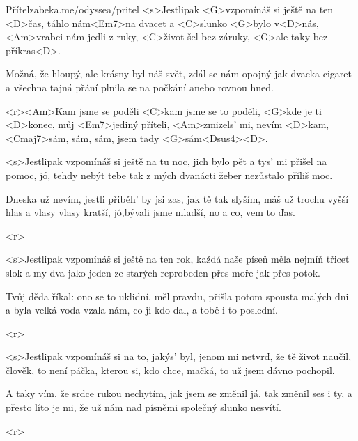 \begin{song}{51}{Přítel}{zabeka.me/odyssea/pritel}
	<s>Jestlipak <G>vzpomínáš si ještě na ten <D>čas,
	táhlo nám<Em7>na dvacet a <C>slunko <G>bylo v<D>nás,
	<Am>vrabci nám jedli z ruky,
	<C>život šel bez záruky,
	<G>ale taky bez příkras<D>.

	Možná, že hloupý, ale krásny byl náš svět,
	zdál se nám opojný jak dvacka cigaret
	a všechna tajná přání
	plnila se na počkání anebo rovnou hned.

	<r><Am>Kam jsme se poděli
	<C>kam jsme se to poděli,
	<G>kde je ti <D>konec, můj <Em7>jediný příteli,
	<Am>zmizels' mi, nevím <D>kam,
	<Cmaj7>sám, sám, sám, jsem tady <G>sám<Dsus4><D>.

	<s>Jestlipak vzpomínáš si ještě na tu noc,
	jich bylo pět a tys' mi přišel na pomoc,
	jó, tehdy nebýt tebe tak z mých
	dvanácti žeber nezůstalo příliš moc.

	Dneska už nevím, jestli přiběh' by jsi zas,
	jak tě tak slyším, máš už trochu vyšší hlas
	a vlasy vlasy kratší, jó,bývali jsme mladší,
	no a co, vem to ďas.

	<r>

	<s>Jestlipak vzpomínáš si ještě na ten rok,
	každá naše píseň měla nejmíň třicet slok
	a my dva jako jeden ze starých reprobeden
	přes moře jak přes potok.

	Tvůj děda říkal: ono se to uklidní,
	měl pravdu, přišla potom spousta malých dni
	a byla velká voda vzala nám, co ji kdo dal,
	a tobě i to poslední.

	<r>

	<s>Jestlipak vzpomínáš si na to, jakýs' byl,
	jenom mi netvrď, že tě život naučil,
	člověk, to není páčka,
	kterou si, kdo chce, mačká,
	to už jsem dávno pochopil.

	A taky vím, že srdce rukou nechytím,
	jak jsem se změnil já, tak změnil ses i ty,
	a přesto líto je mi, že už nám nad písněmi
	společný slunko nesvítí.

	<r>

\end{song}
